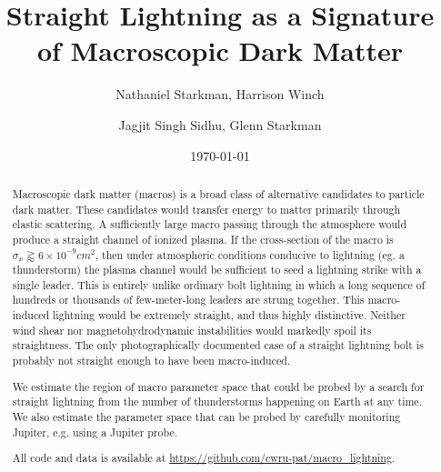\documentclass[%
 reprint,
 amsmath,amssymb,
 aps,
]{revtex4-2}
\begin{document}

\title{Straight Lightning as a Signature of Macroscopic Dark Matter}

\author{Nathaniel Starkman, Harrison Winch}%
%

\author{Jagjit Singh Sidhu, Glenn Starkman}

\date{\today}


\begin{abstract}

    Macroscopic dark matter (macros) is a broad class of alternative candidates to particle dark matter. These candidates would transfer energy to matter primarily through  elastic scattering. A sufficiently large macro passing through the atmosphere would produce a straight channel of ionized plasma. If the cross-section of the macro is $\sigma_x\gtrapprox6\times10^{-9}cm^2$, then under atmospheric conditions conducive to lightning (eg. a thunderstorm) the plasma channel would be sufficient to seed a lightning strike with a single leader. This is entirely unlike ordinary bolt lightning in which a long sequence of hundreds or thousands of few-meter-long leaders are strung together. This macro-induced lightning would be extremely straight, and thus highly distinctive. Neither wind shear nor magnetohydrodynamic instabilities would markedly spoil its straightness. The only photographically documented case of a straight lightning bolt is probably not straight enough to have been macro-induced.

    We estimate the region of macro parameter space that could be probed by a search for straight lightning from the number of thunderstorms happening on Earth at any time. We also estimate the parameter space that can be probed by carefully monitoring Jupiter, e.g. using a Jupiter probe.

    All code and data is available at \url{https://github.com/cwru-pat/macro_lightning}.

\end{abstract}
\end{document}
